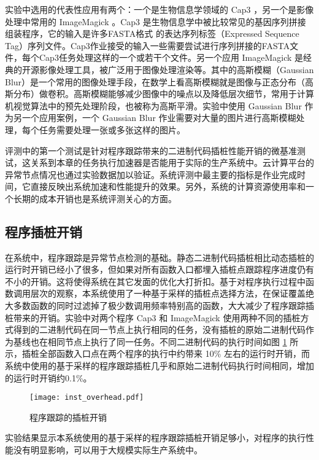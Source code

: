 实验中选用的代表性应用有两个：一个是生物信息学领域的 Cap3 \cite{Huang:1999:Cap3}，另一个是影像处理中常用的 ImageMagick \cite{imagemagick}。Cap3 是生物信息学中被比较常见的基因序列拼接组装程序，它的输入是许多FASTA格式 \cite{fasta} 的表达序列标签（Expressed Sequence Tag）序列文件。Cap3作业接受的输入一些需要尝试进行序列拼接的FASTA文件，每个Cap3任务处理这样的一个或若干个文件。另一个应用 ImageMagick 是经典的开源影像处理工具，被广泛用于图像处理渲染等。其中的高斯模糊（Gaussian Blur）是一个常用的图像处理手段，在数学上看高斯模糊就是图像与正态分布（高斯分布）做卷积。高斯模糊能够减少图像中的噪点以及降低层次细节，常用于计算机视觉算法中的预先处理阶段，也被称为高斯平滑。实验中使用 Gaussian Blur 作为另一个应用案例，一个 Gaussian Blur 作业需要对大量的图片进行高斯模糊处理，每个任务需要处理一张或多张这样的图片。

评测中的第一个测试是针对程序跟踪带来的二进制代码插桩性能开销的微基准测试，这关系到本章的任务执行加速器是否能用于实际的生产系统中。云计算平台的异常节点情况也通过实验数据加以验证。系统评测中最主要的指标是作业完成时间，它直接反映出系统加速和性能提升的效果。另外，系统的计算资源使用率和一个长期的成本开销也是系统评测关心的方面。

\subsection{程序插桩开销}
\label{sec:no2_overhead}
在系统中，程序跟踪是异常节点检测的基础。静态二进制代码插桩相比动态插桩的运行时开销已经小了很多，但如果对所有函数入口都埋入插桩点跟踪程序进度仍有不小的开销。这将使得系统在其它发面的优化大打折扣。基于对程序执行过程中函数调用层次的观察，本系统使用了一种基于采样的插桩点选择方法，在保证覆盖绝大多数函数的同时过滤掉了极少数调用频率特别高的函数，大大减少了程序跟踪插桩带来的开销。实验中对两个程序 Cap3 和 ImageMagick 使用两种不同的插桩方式得到的二进制代码在同一节点上执行相同的任务，没有插桩的原始二进制代码作为基线也在相同节点上执行了同一任务。不同二进制代码的执行时间如图 \ref{figure:inst_overhead} 所示，插桩全部函数入口点在两个程序的执行中约带来 10\% 左右的运行时开销，而系统中使用的基于采样的程序跟踪插桩几乎和原始二进制代码执行时间相同，增加的运行时开销约0.1\%。

\begin{figure}
  \centering
  \texttt{[image: inst\_overhead.pdf]}
  \caption{程序跟踪的插桩开销}
  \label{figure:inst_overhead}
\end{figure}

实验结果显示本系统使用的基于采样的程序跟踪插桩开销足够小，对程序的执行性能没有明显影响，可以用于大规模实际生产系统中。

